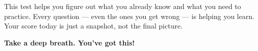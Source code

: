 {\begin{tcolorbox}[
    enhanced,
    colback=funYellowLight,
    colframe=funYellow!60,
    arc=10pt,
    boxrule=1pt,
    left=6mm, right=6mm, top=4mm, bottom=4mm,
]
\vspace{2mm}

This test helps you figure out what you already know and what you need to practice. Every question — even the ones you get wrong — is helping you learn. Your score today is just a snapshot, not the final picture.
\end{tcolorbox}

\vspace{4mm}

\begin{center}
{\large\bfseries\color{funBlueDark} \faStar\hspace{2mm}Take a deep breath. You've got this!\hspace{2mm}\faStar}
\end{center}

}
\newpage

